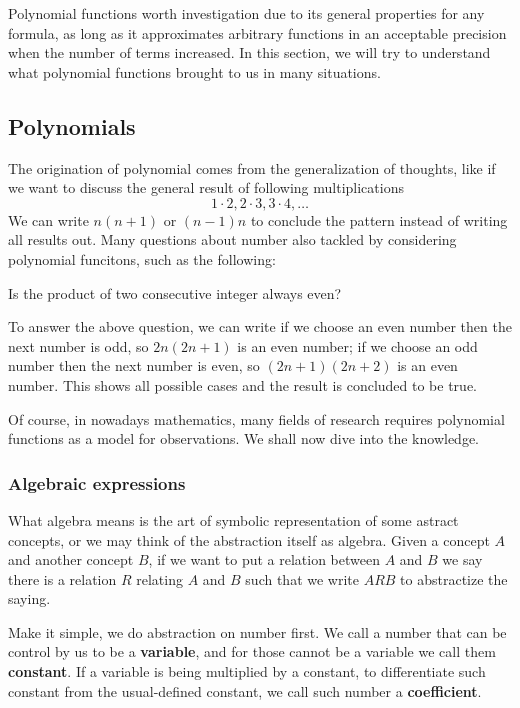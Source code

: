 \documentclass[12pt]{article}
\begin{document}
    Polynomial functions worth investigation due to its general properties for any formula, as long as it approximates arbitrary functions in an acceptable precision when the number of terms increased. In this section, we will try to understand what polynomial functions brought to us in many situations.

    \subsection{Polynomials}

    The origination of polynomial comes from the generalization of thoughts, like if we want to discuss the general result of following multiplications \[1\cdot 2, 2\cdot 3, 3\cdot 4, \dots\]
    We can write $n(n+1)$ or $(n-1)n$ to conclude the pattern instead of writing all results out. Many questions about number also tackled by considering polynomial funcitons, such as the following: 
    
    Is the product of two consecutive integer always even?

    To answer the above question, we can write if we choose an even number then the next number is odd, so $2n(2n+1)$ is an even number; if we choose an odd number then the next number is even, so $(2n+1)(2n+2)$ is an even number. This shows all possible cases and the result is concluded to be true.

    Of course, in nowadays mathematics, many fields of research requires polynomial functions as a model for observations. We shall now dive into the knowledge.
    \subsubsection*{Algebraic expressions}

    What algebra means is the art of symbolic representation of some astract concepts, or we may think of the abstraction itself as algebra. Given a concept $A$ and another concept $B$, if we want to put a relation between $A$ and $B$ we say there is a relation $R$ relating $A$ and $B$ such that we write $ARB$ to abstractize the saying.
    
    Make it simple, we do abstraction on number first. We call a number that can be control by us to be a \textbf{variable}, and for those cannot be a variable we call them \textbf{constant}. If a variable is being multiplied by a constant, to differentiate such constant from the usual-defined constant, we call such number a \textbf{coefficient}.
\end{document}
